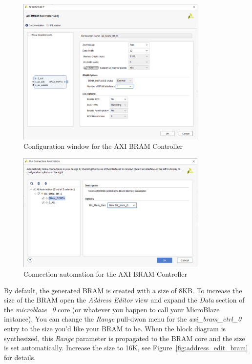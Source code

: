 \documentclass[11pt]{article}
\begin{document}
\begin{figure}[!h]
    \centering
    \includegraphics[width=0.84\textwidth]{images/bram_cntr_config.png}
    \caption{Configuration window for the AXI BRAM Controller}
    \label{fig:bram_cntr_config}
\end{figure}

\begin{figure}[!h]
    \centering
    \includegraphics[width=0.84\textwidth]{images/conn_auto_bram.png}
    \caption{Connection automation for the AXI BRAM Controller}
    \label{fig:conn_auto_bram}
\end{figure}

By default, the generated BRAM is created with a size of 8KB. To increase the size of the BRAM open the \textit{Address Editor} view and expand the \textit{Data} section of the \textit{microblaze\_0} core (or whatever you happen to call your MicroBlaze instance). You can change the \textit{Range} pull-dwon menu for the \textit{axi\_bram\_ctrl\_0} entry to the size you'd like your BRAM to be. When the block diagram is synthesized, this \textit{Range} parameter is propagated to the BRAM core and the size is set automatically. Increase the size to 16K, see Figure~\ref{fig:address_edit_bram} for details.
\end{document}
